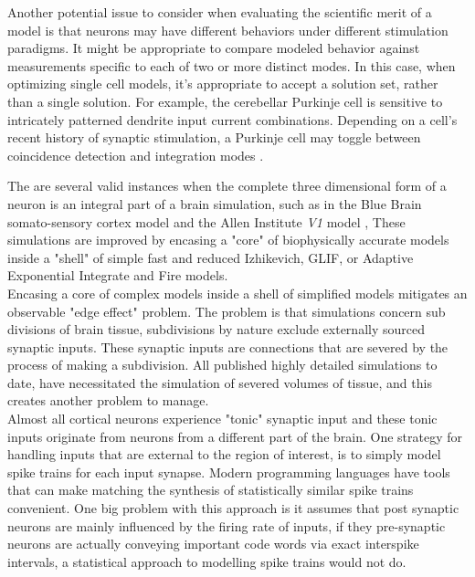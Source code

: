 Another potential issue to consider when evaluating the scientific merit of a model is that neurons may have different behaviors under different stimulation paradigms. It might be appropriate to compare modeled behavior against measurements specific to each of two or more distinct modes. In this case, when optimizing single cell models, it’s appropriate to accept a solution set, rather than a single solution. For example, the cerebellar Purkinje cell is sensitive to intricately patterned dendrite input current combinations. Depending on a cell’s recent history of synaptic stimulation, a Purkinje cell may toggle between coincidence detection and integration modes \cite{ratte2013impact}.

The are several valid instances when the complete three dimensional form of a neuron is an integral part of a brain simulation, such as in the Blue Brain somato-sensory cortex model \cite{markram2006blue} and the Allen Institute \emph{V1} model \cite{billeh2020systematic}, These simulations are improved by encasing a "core" of biophysically accurate models inside a "shell" of simple fast and reduced Izhikevich, GLIF, or Adaptive Exponential Integrate and Fire models.\\ 

Encasing a core of complex models inside a shell of simplified models mitigates an observable "edge effect" problem. The problem is that simulations concern sub divisions of brain tissue, subdivisions by nature exclude externally sourced synaptic inputs. These synaptic inputs are connections that are severed by the process of making a subdivision. All published highly detailed simulations to date, have necessitated the simulation of severed volumes of tissue, and this creates another problem to manage.\\
Almost all cortical neurons experience "tonic" synaptic input and these tonic inputs originate from neurons from a different part of the brain. One strategy for handling inputs that are external to the region of interest, is to simply model spike trains for each input synapse. Modern programming languages have tools that can make matching the synthesis of statistically similar spike trains convenient. One big problem with this approach is it assumes that post synaptic neurons are mainly influenced by the firing rate of inputs, if they pre-synaptic neurons are actually conveying important code words via exact interspike intervals, a statistical approach to modelling spike trains would not do.\\

